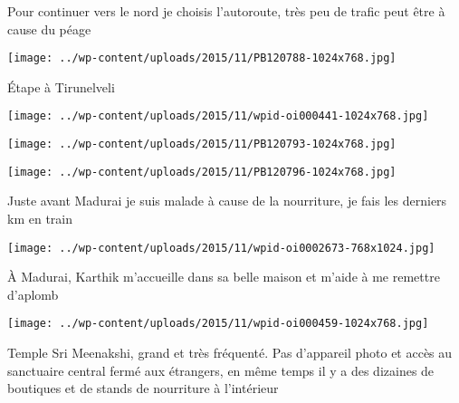  

 Pour continuer vers le nord je choisis l'autoroute, très peu de trafic peut être à cause du péage 

 

\begin{center} \texttt{[image: ../wp-content/uploads/2015/11/PB120788-1024x768.jpg]} \end{center}

 

 Étape à Tirunelveli 

 

\begin{center} \texttt{[image: ../wp-content/uploads/2015/11/wpid-oi000441-1024x768.jpg]} \end{center}

 

 

\begin{center} \texttt{[image: ../wp-content/uploads/2015/11/PB120793-1024x768.jpg]} \end{center}

 

 

\begin{center} \texttt{[image: ../wp-content/uploads/2015/11/PB120796-1024x768.jpg]} \end{center}

 

 Juste avant Madurai je suis malade à cause de la nourriture, je fais les derniers km en train 

 

\begin{center} \texttt{[image: ../wp-content/uploads/2015/11/wpid-oi0002673-768x1024.jpg]} \end{center}

 

 À Madurai, Karthik m'accueille dans sa belle maison et m'aide à me remettre d'aplomb 

 

\begin{center} \texttt{[image: ../wp-content/uploads/2015/11/wpid-oi000459-1024x768.jpg]} \end{center}

 

 Temple Sri Meenakshi, grand et très fréquenté. Pas d'appareil photo et accès au sanctuaire central fermé aux étrangers, en même temps il y a des dizaines de boutiques et de stands de nourriture à l'intérieur 

